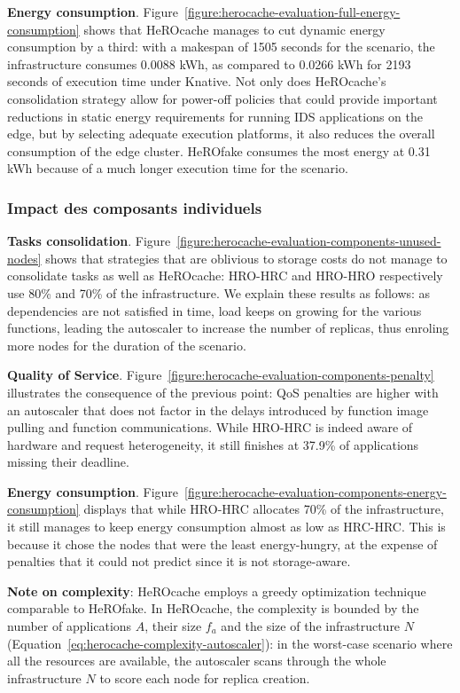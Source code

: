 \textbf{Energy consumption}. Figure~\ref{figure:herocache-evaluation-full-energy-consumption} shows that HeROcache manages to cut dynamic energy consumption by a third: with a makespan of 1505 seconds for the scenario, the infrastructure consumes 0.0088 kWh, as compared to 0.0266 kWh for 2193 seconds of execution time under Knative. Not only does HeROcache's consolidation strategy allow for power-off policies that could provide important reductions in static energy requirements for running IDS applications on the edge, but by selecting adequate execution platforms, it also reduces the overall consumption of the edge cluster. HeROfake consumes the most energy at 0.31 kWh because of a much longer execution time for the scenario.

\subsubsection{Impact des composants individuels}

\textbf{Tasks consolidation}. Figure~\ref{figure:herocache-evaluation-components-unused-nodes} shows that strategies that are oblivious to storage costs do not manage to consolidate tasks as well as HeROcache: HRO-HRC and HRO-HRO respectively use 80\% and 70\% of the infrastructure. We explain these results as follows: as dependencies are not satisfied in time, load keeps on growing for the various functions, leading the autoscaler to increase the number of replicas, thus enroling more nodes for the duration of the scenario.%

\textbf{Quality of Service}. Figure~\ref{figure:herocache-evaluation-components-penalty} illustrates the consequence of the previous point: QoS penalties are higher with an autoscaler that does not factor in the delays introduced by function image pulling and function communications. While HRO-HRC is indeed aware of hardware and request heterogeneity, it still finishes at 37.9\% of applications missing their deadline.

\textbf{Energy consumption}. Figure~\ref{figure:herocache-evaluation-components-energy-consumption} displays that while HRO-HRC allocates 70\% of the infrastructure, it still manages to keep energy consumption almost as low as HRC-HRC. This is because it chose the nodes that were the least energy-hungry, at the expense of penalties that it could not predict since it is not storage-aware.

\textbf{Note on complexity}: HeROcache employs a greedy optimization technique comparable to HeROfake. In HeROcache, the complexity is bounded by the number of applications $A$, their size $f_{a}$ and the size of the infrastructure $N$ (Equation~\ref{eq:herocache-complexity-autoscaler}): in the worst-case scenario where all the resources are available, the autoscaler scans through the whole infrastructure $N$ to score each node for replica creation.


